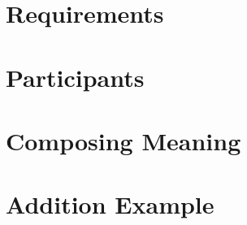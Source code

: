 \documentclass{article}
\begin{document}
\newpage
\section{Requirements}


\newpage
\section{Participants}


\newpage
\section{Composing Meaning}


\newpage
\section{Addition Example}

\end{document}
